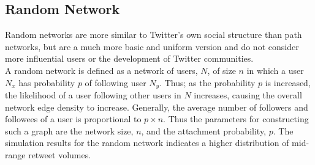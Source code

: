 \subsection{Random Network}
Random networks are more similar to Twitter's own social structure than path networks, but are a much more basic and uniform version and do not consider more influential users or the development of Twitter communities.
\\
A random network is defined as a network of users, $ N $, of size $ n $ in which a user $ N_x $ has probability $ p $ of following user $ N_y $. Thus; as the probability $ p $ is increased, the likelihood of a user following other users in $ N $ increases, causing the overall network edge density to increase. Generally, the average number of followers and followees of a user is proportional to $ p\times n $. Thus the parameters for constructing such a graph are the network size, $n$, and the attachment probability, $p$. The simulation results for the random network indicates a higher distribution of mid-range retweet volumes.
\begin{figure}[h]
\end{figure}
